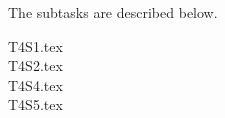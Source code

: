 
The subtasks are described below.

\pagebreak
{T4S1.tex}\\

\pagebreak
{T4S2.tex}\\



\pagebreak
{T4S4.tex}\\

\pagebreak
{T4S5.tex}
